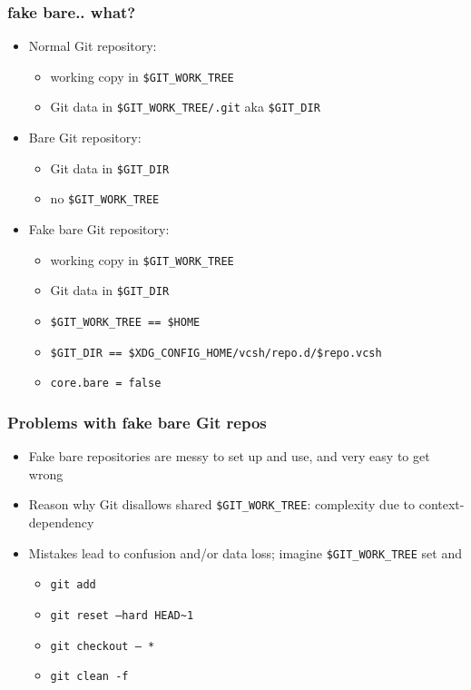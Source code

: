 \documentclass[t]{beamer}
\begin{document}
\begin{frame}
	\frametitle{fake bare.. what?}
	\begin{itemize}
		\item Normal Git repository:
		\begin{itemize}
			\item working copy in \texttt{\$GIT\_WORK\_TREE}
			\item Git data in \texttt{\$GIT\_WORK\_TREE/.git} aka \texttt{\$GIT\_DIR}
		\end{itemize}
		\item Bare Git repository:
		\begin{itemize}
			\item Git data in \texttt{\$GIT\_DIR}
			\item no  \texttt{\$GIT\_WORK\_TREE}
		\end{itemize}
		\item Fake bare Git repository:
		\begin{itemize}
			\item working copy in \texttt{\$GIT\_WORK\_TREE}
			\item Git data in \texttt{\$GIT\_DIR}
			\item \texttt{\$GIT\_WORK\_TREE == \$HOME}
			\item \texttt{\$GIT\_DIR == \$XDG\_CONFIG\_HOME/vcsh/repo.d/\$repo.vcsh}
			\item \texttt{core.bare = false}
		\end{itemize}
	\end{itemize}
\end{frame}

\begin{frame}
	\frametitle{Problems with fake bare Git repos}
	\begin{itemize}
		\item Fake bare repositories are messy to set up and use, and very easy to get wrong
		\item Reason why Git disallows shared \texttt{\$GIT\_WORK\_TREE}: complexity due to context-dependency
		\item Mistakes lead to confusion and/or data loss; imagine \texttt{\$GIT\_WORK\_TREE} set and
		\begin{itemize}
			\item \texttt{git add}
			\item \texttt{git reset --hard HEAD\~{}1}
			\item \texttt{git checkout -- *}
			\item \texttt{git clean -f}
		\end{itemize}
	\end{itemize}
\end{frame}
\end{document}
